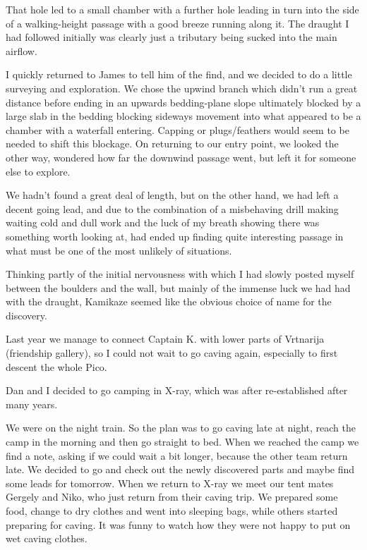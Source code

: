 That hole led to a small chamber with a further hole leading in turn
into the side of a walking-height passage with a good breeze running
along it. The draught I had followed initially was clearly just a
tributary being sucked into the main airflow.

I quickly returned to James to tell him of the find, and we decided to
do a little surveying and exploration. We chose the upwind branch which
didn't run a great distance before ending in an upwards bedding-plane
slope ultimately blocked by a large slab in the bedding blocking
sideways movement into what appeared to be a chamber with a waterfall
entering. Capping or plugs/feathers would seem to be needed to shift
this blockage. On returning to our entry point, we looked the other way,
wondered how far the downwind passage went, but left it for someone else
to explore.

We hadn't found a great deal of length, but on the other hand, we had
left a decent going lead, and due to the combination of a misbehaving
drill making waiting cold and dull work and the luck of my breath
showing there was something worth looking at, had ended up finding quite
interesting passage in what must be one of the most unlikely of
situations.

Thinking partly of the initial nervousness with which I had slowly
posted myself between the boulders and the wall, but mainly of the
immense luck we had had with the draught, Kamikaze seemed like the
obvious choice of name for the discovery.


Last year we manage to connect Captain K. with lower parts of Vrtnarija
(friendship gallery), so I could not wait to go caving again, especially
to first descent the whole Pico.

Dan and I decided to go camping in X-ray, which was after re-established
after many years.

We were on the night train. So the plan was to go caving late at night,
reach the camp in the morning and then go straight to bed. When we
reached the camp we find a note, asking if we could wait a bit longer,
because the other team return late. We decided to go and check out the
newly discovered parts and maybe find some leads for tomorrow. When we
return to X-ray we meet our tent mates Gergely and Niko, who just return
from their caving trip. We prepared some food, change to dry clothes and
went into sleeping bags, while others started preparing for caving. It
was funny to watch how they were not happy to put on wet caving clothes.

